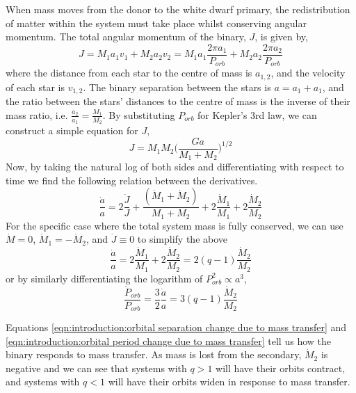 When mass moves from the donor to the white dwarf primary, the redistribution of matter within the system must take place whilst conserving angular momentum. The total angular momentum of the binary, $J$, is given by,
\begin{equation}
    J = M_1 a_1 v_1 + M_2 a_2 v_2 = M_1 a_1 \frac{2\pi a_1}{P_{orb}} + M_2 a_2 \frac{2\pi a_2}{P_{orb}}
\end{equation}
where the distance from each star to the centre of mass is $a_{1,2}$, and the velocity of each star is $v_{1,2}$. 
The binary separation between the stars is $a = a_1 + a_1$, and the ratio between the stars' distances to the centre of mass is the inverse of their mass ratio, i.e. $\frac{a_2}{a_1} = \frac{M_1}{M_2}$. By substituting $P_{orb}$ for Kepler's 3rd law, we can construct a simple equation for $J$,
\begin{equation}
    J = M_1 M_2 \bigg( \frac{Ga}{M_1 + M_2} \bigg)^{1/2}
\end{equation}
Now, by taking the natural log of both sides and differentiating with respect to time we find the following relation between the derivatives.
\begin{equation}
    \frac{\dot a}{a} = 2\frac{\dot J}{J} + \frac{(\dot M_1+\dot M_2)}{M_1+M_2} + 2\frac{\dot M_1}{M_1} + 2\frac{\dot M_2}{M_2}
\end{equation}
For the specific case where the total system mass is fully conserved, we can use $\dot M = 0$, $\dot M_1 = -\dot M_2$, and $\dot J \equiv 0$ to simplify the above
\begin{equation}
    \label{eqn:introduction:orbital separation change due to mass transfer}
    \frac{\dot a}{a} = 2\frac{\dot M_1}{M_1} + 2\frac{\dot M_2}{M_2} = 2(q-1) \frac{\dot M_2}{M_2}
\end{equation}
or by similarly differentiating the logarithm of $P_{orb}^2 \propto a^3$,
\begin{equation}
    \label{eqn:introduction:orbital period change due to mass transfer}
    \frac{\dot P_{orb}}{P_{orb}} = \frac{3}{2}\frac{\dot a}{a} = 3(q-1) \frac{\dot M_2}{M_2}
\end{equation}

Equations \ref{eqn:introduction:orbital separation change due to mass transfer} and \ref{eqn:introduction:orbital period change due to mass transfer} tell us how the binary responds to mass transfer. As mass is lost from the secondary, $\dot M_2$ is negative and we can see that systems with $q>1$ will have their orbits contract, and systems with $q<1$ will have their orbits widen in response to mass transfer.

